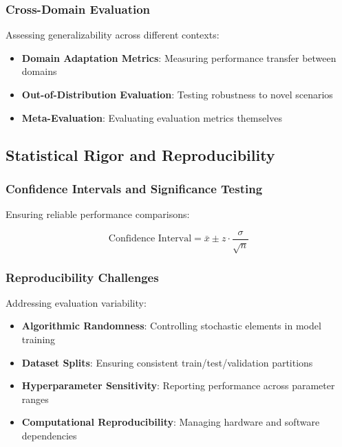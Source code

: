\subsubsection{Cross-Domain Evaluation}

Assessing generalizability across different contexts:

\begin{itemize}
    \item \textbf{Domain Adaptation Metrics}: Measuring performance transfer between domains
    \item \textbf{Out-of-Distribution Evaluation}: Testing robustness to novel scenarios
    \item \textbf{Meta-Evaluation}: Evaluating evaluation metrics themselves
\end{itemize}

\subsection{Statistical Rigor and Reproducibility}

\subsubsection{Confidence Intervals and Significance Testing}

Ensuring reliable performance comparisons:

\begin{equation}
\text{Confidence Interval} = \bar{x} \pm z \cdot \frac{\sigma}{\sqrt{n}}
\label{eq:confidence_interval}
\end{equation}

\subsubsection{Reproducibility Challenges}

Addressing evaluation variability:

\begin{itemize}
    \item \textbf{Algorithmic Randomness}: Controlling stochastic elements in model training
    \item \textbf{Dataset Splits}: Ensuring consistent train/test/validation partitions
    \item \textbf{Hyperparameter Sensitivity}: Reporting performance across parameter ranges
    \item \textbf{Computational Reproducibility}: Managing hardware and software dependencies
\end{itemize}


